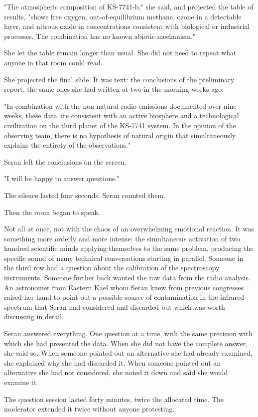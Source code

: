 \documentclass[11pt,a5paper,twoside]{book}
\begin{document}
"The atmospheric composition of KS-7741-b," she said, and projected the table of results, "shows free oxygen, out-of-equilibrium methane, ozone in a detectable layer, and nitrous oxide in concentrations consistent with biological or industrial processes. The combination has no known abiotic mechanism."

She let the table remain longer than usual. She did not need to repeat what anyone in that room could read.

She projected the final slide. It was text: the conclusions of the preliminary report, the same ones she had written at two in the morning weeks ago.

"In combination with the non-natural radio emissions documented over nine weeks, these data are consistent with an active biosphere and a technological civilization on the third planet of the KS-7741 system. In the opinion of the observing team, there is no hypothesis of natural origin that simultaneously explains the entirety of the observations."

Seran left the conclusions on the screen.

"I will be happy to answer questions."

The silence lasted four seconds. Seran counted them.

Then the room began to speak.

Not all at once, not with the chaos of an overwhelming emotional reaction. It was something more orderly and more intense: the simultaneous activation of two hundred scientific minds applying themselves to the same problem, producing the specific sound of many technical conversations starting in parallel. Someone in the third row had a question about the calibration of the spectroscopy instruments. Someone further back wanted the raw data from the radio analysis. An astronomer from Eastern Kael whom Seran knew from previous congresses raised her hand to point out a possible source of contamination in the infrared spectrum that Seran had considered and discarded but which was worth discussing in detail.

Seran answered everything. One question at a time, with the same precision with which she had presented the data. When she did not have the complete answer, she said so. When someone pointed out an alternative she had already examined, she explained why she had discarded it. When someone pointed out an alternative she had not considered, she noted it down and said she would examine it.

The question session lasted forty minutes, twice the allocated time. The moderator extended it twice without anyone protesting.
\end{document}
